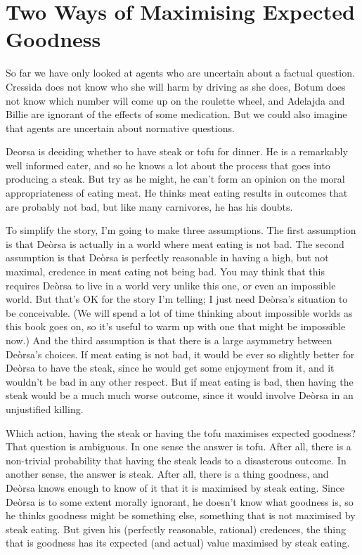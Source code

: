 \documentclass[
  10pt,
  letterpaper,
  twoside]{scrbook}
\begin{document}
\section{Two Ways of Maximising Expected
Goodness}\label{twowaysofmaximisingexpectedgoodness}

So far we have only looked at agents who are uncertain about a factual
question. {Cressida} does not know who she will harm by driving as she
does, {Botum} does not know which number will come up on the roulette
wheel, and {Adelajda} and {Billie} are ignorant of the effects of some
medication. But we could also imagine that agents are uncertain about
normative questions.

{Deorsa} is deciding whether to have steak or tofu for dinner. He is a
remarkably well informed eater, and so he knows a lot about the process
that goes into producing a steak. But try as he might, he can't form an
opinion on the moral appropriateness of eating meat. He thinks meat
eating results in outcomes that are probably not bad, but like many
carnivores, he has his doubts.

To simplify the story, I'm going to make three assumptions. The first
assumption is that Deòrsa is actually in a world where meat eating is
not bad. The second assumption is that Deòrsa is perfectly reasonable in
having a high, but not maximal, credence in meat eating not being bad.
You may think that this requires Deòrsa to live in a world very unlike
this one, or even an impossible world. But that's OK for the story I'm
telling; I just need Deòrsa's situation to be conceivable. (We will
spend a lot of time thinking about impossible worlds as this book goes
on, so it's useful to warm up with one that might be impossible now.)
And the third assumption is that there is a large asymmetry between
Deòrsa's choices. If meat eating is not bad, it would be ever so
slightly better for Deòrsa to have the steak, since he would get some
enjoyment from it, and it wouldn't be bad in any other respect. But if
meat eating is bad, then having the steak would be a much much worse
outcome, since it would involve Deòrsa in an unjustified killing.

Which action, having the steak or having the tofu maximises expected
goodness? That question is ambiguous. In one sense the answer is tofu.
After all, there is a non-trivial probability that having the steak
leads to a disasterous outcome. In another sense, the answer is steak.
After all, there is a thing goodness, and Deòrsa knows enough to know of
it that it is maximised by steak eating. Since Deòrsa is to some extent
morally ignorant, he doesn't know what goodness is, so he thinks
goodness might be something else, something that is not maximised by
steak eating. But given his (perfectly reasonable, rational) credences,
the thing that is goodness has its expected (and actual) value maximised
by steak eating.
\end{document}
